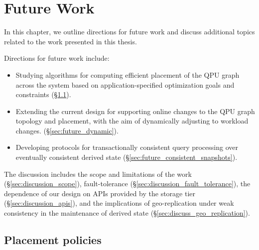 \section{Future Work}

In this chapter, we outline directions for future work
and discuss additional topics related to the work presented in this thesis.

\noindent
Directions for future work include:

\begin{itemize}

  \item Studying algorithms for computing efficient placement of the QPU graph across the system
  based on application-specified optimization goals and constraints (\S\ref{sec:future_placement_policies}).

  \item Extending the current design for supporting online changes to the QPU graph topology and placement,
  with the aim of dynamically adjusting to workload changes. (\S\ref{sec:future_dynamic}).

  \item Developing protocols for transactionally consistent query processing over eventually consistent derived state
  (\S\ref{sec:future_consistent_snapshots}).

\end{itemize}

The discussion includes the scope and limitations of the work (\S\ref{sec:discussion_scope}),
fault-tolerance (\S\ref{sec:discussion_fault_tolerance}),
the dependence of our design on APIs provided by the storage tier (\S\ref{sec:discussion_apis}),
and the implications of geo-replication under weak consistency in the maintenance of
derived state (\S\ref{sec:discuss_geo_replication}).

\subsection{Placement policies}
\label{sec:future_placement_policies}


